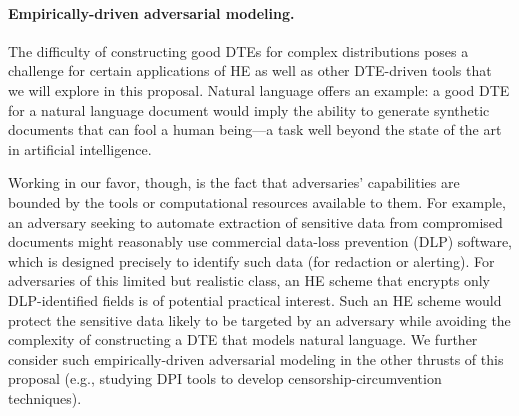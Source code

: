 
\iffalse
\paragraph{Typo-safety.} Output of a valid-looking plaintext upon decryption with an incorrect key is essential to the security of an HE construction. This feature, however, creates a usability challenge, as it can also result in presentation of a incorrect but valid-looking plaintext to a legitimate user, e.g., one that has made a typo in entering a password. Despite promising proposed solutions, e.g., use of security skins~\cite{dhamija2005battle} and online testing for the case of password managers, the problem of typo-safety represents a major issue in the practical use of HE. In Section~\ref{sec:human}, we propose a solution in the form of DSSS, a new approach derived from application of the DSC framework to fuzzy cryptography.
\fi

\paragraph{Empirically-driven adversarial modeling.} The difficulty of
constructing good DTEs for complex distributions poses a challenge for
certain applications of HE as well as other DTE-driven tools that we will explore in this proposal. Natural language offers an example: a good DTE for a natural language document would imply the ability to generate synthetic documents that can fool a human being---a task well beyond the state of the art in artificial intelligence.

Working in our favor, though, is the fact that adversaries' capabilities are bounded by the tools or computational resources available to them. For example, an adversary seeking to automate extraction of sensitive data from compromised documents might reasonably use commercial data-loss prevention (DLP) software, which is designed precisely to identify such data (for redaction or alerting). For adversaries of this limited but realistic class, an HE scheme that encrypts only DLP-identified fields is of potential practical interest. Such an HE scheme would protect the sensitive data likely to be targeted by an adversary while avoiding the complexity of constructing a DTE that models natural language. We further consider such empirically-driven adversarial modeling in the other thrusts of this proposal (e.g., studying DPI tools to develop censorship-circumvention techniques). 

